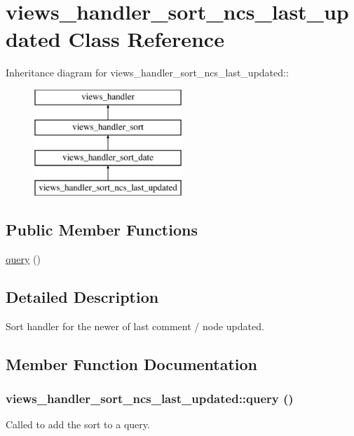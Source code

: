 \hypertarget{classviews__handler__sort__ncs__last__updated}{
\section{views\_\-handler\_\-sort\_\-ncs\_\-last\_\-updated Class Reference}
\label{classviews__handler__sort__ncs__last__updated}
}
Inheritance diagram for views\_\-handler\_\-sort\_\-ncs\_\-last\_\-updated::\begin{figure}[H]
\begin{center}
\leavevmode
\includegraphics[height=4cm]{classviews__handler__sort__ncs__last__updated}
\end{center}
\end{figure}
\subsection*{Public Member Functions}
\begin{DoxyCompactItemize}
\item 
\hyperlink{classviews__handler__sort__ncs__last__updated_a05d2ef9eb8727ee81915b34254d99355}{query} ()
\end{DoxyCompactItemize}


\subsection{Detailed Description}
Sort handler for the newer of last comment / node updated. 

\subsection{Member Function Documentation}
\hypertarget{classviews__handler__sort__ncs__last__updated_a05d2ef9eb8727ee81915b34254d99355}{
\subsubsection[{query}]{\setlength{\rightskip}{0pt plus 5cm}views\_\-handler\_\-sort\_\-ncs\_\-last\_\-updated::query ()}}
\label{classviews__handler__sort__ncs__last__updated_a05d2ef9eb8727ee81915b34254d99355}
Called to add the sort to a query. 

